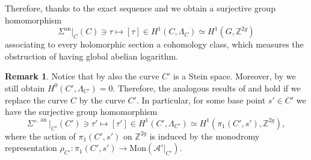 \documentclass[10 pt,a4paper]{article}
\theoremstyle{plain}
\theoremstyle{definition}
\newtheorem{rem}[thm]{Remark}
\theoremstyle{named}
\newcommand{\cA}{\mathcal A}
\newcommand{\bZ}{\mathbb Z}
\DeclareMathOperator{\an}{an}
\begin{document}

Therefore, thanks to the exact sequence  and  we obtain a surjective group homomorphism
\[
\Sigma^{\an}|_C(C) \ni \tau \mapsto [\tau] \in H^1(C,\Lambda_C) \simeq H^1(G,\bZ^{2g})
\]
associating to every holomorphic section a cohomology class, which measures the obstruction of having global abelian logarithm.

\begin{rem}\label{sameForC'}
    Notice that by  also the curve $C'$ is a Stein space. Moreover, by  we still obtain  $H^0(C',\Lambda_{C'})=0$. Therefore, the analogous results of  and  hold if we replace the curve $C$ by the curve $C'$. In particular, for some base point $s' \in C'$ we have the surjective group homomorphism
    \[
    \Sigma'^{,\an}|_{C'}(C') \ni \tau' \mapsto [\tau'] \in H^1(C',\Lambda_{C'}) \simeq H^1(\pi_1(C',s'),\bZ^{2g}),
    \]
    where the action of $\pi_1(C',s')$ on $\bZ^{2g}$ is induced by the monodromy representation $\rho_{C'}: \pi_1(C',s') \rightarrow \textrm{Mon}(\cA'|_{C'})$.
\end{rem}
\end{document}
